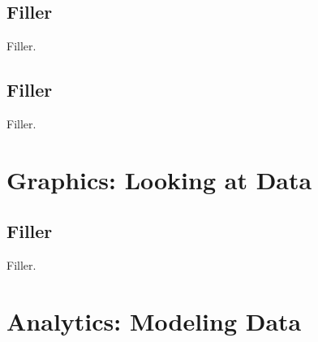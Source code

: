 \documentclass{book}
\begin{document}
\newif\ifplastex
\plastexfalse

\ifplastex

\newcommand{\tbl}[2]{#2\caption{#1}}

\else


\fi



\makeatletter
\makeatother


\chapter{Filler}
Filler.


\makeatletter
\makeatother


\mainmatter

\chapter{Filler}
Filler.

\part{Graphics: Looking at Data}
\label{part:graphics}

\chapter{Filler}
Filler.

 
\part{Analytics: Modeling Data}
\label{part:analytics}
\end{document}
